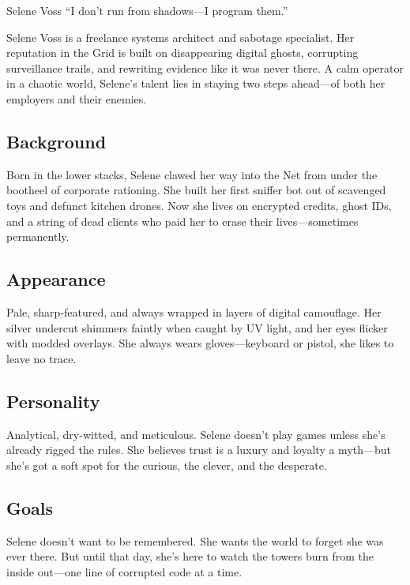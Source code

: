 \begin{WyrdCharacterSheet}
    {Selene Voss}
    {“I don’t run from shadows—I program them.”}
  
    Selene Voss is a freelance systems architect and sabotage specialist. Her reputation in the Grid is built on disappearing digital ghosts, corrupting surveillance trails, and rewriting evidence like it was never there. A calm operator in a chaotic world, Selene’s talent lies in staying two steps ahead—of both her employers and their enemies.

    \subsection{Background}
    Born in the lower stacks, Selene clawed her way into the Net from under the bootheel of corporate rationing. She built her first sniffer bot out of scavenged toys and defunct kitchen drones. Now she lives on encrypted credits, ghost IDs, and a string of dead clients who paid her to erase their lives—sometimes permanently.

    \subsection{Appearance}
    Pale, sharp-featured, and always wrapped in layers of digital camouflage. Her silver undercut shimmers faintly when caught by UV light, and her eyes flicker with modded overlays. She always wears gloves—keyboard or pistol, she likes to leave no trace.

    \subsection{Personality}
    Analytical, dry-witted, and meticulous. Selene doesn’t play games unless she’s already rigged the rules. She believes trust is a luxury and loyalty a myth—but she’s got a soft spot for the curious, the clever, and the desperate.

    \subsection{Goals}
    Selene doesn’t want to be remembered. She wants the world to forget she was ever there. But until that day, she’s here to watch the towers burn from the inside out—one line of corrupted code at a time.
  
    \begin{WyrdStatsBlock}[profile=img/characters/selene_voss]


\end{WyrdStatsBlock}
\end{WyrdCharacterSheet}
